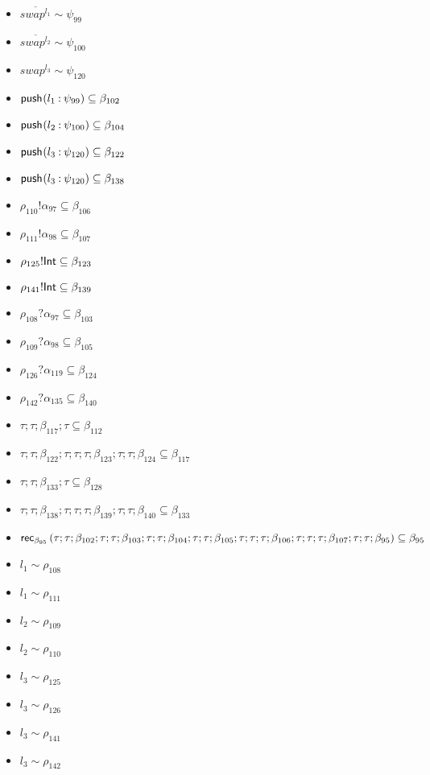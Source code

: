 \documentclass{article}
\begin{document}
\begin{itemize}
\item $ \overline{{swap}^{l_{1}}} \sim\psi_{99} $
\item $ \overline{{swap}^{l_{2}}} \sim\psi_{100} $
\item $ {swap}^{l_{3}} \sim\psi_{120} $
\item $ \pusho{ l_{1}} {\psi_{99}}{} \subseteq \beta_{102} $
\item $ \pusho{ l_{2}} {\psi_{100}}{} \subseteq \beta_{104} $
\item $ \pusho{ l_{3}} {\psi_{120}}{} \subseteq \beta_{122} $
\item $ \pusho{ l_{3}} {\psi_{120}}{} \subseteq \beta_{138} $
\item $ \rho_{110}!\alpha_{97} \subseteq \beta_{106} $
\item $ \rho_{111}!\alpha_{98} \subseteq \beta_{107} $
\item $ \rho_{125}!\tint \subseteq \beta_{123} $
\item $ \rho_{141}!\tint \subseteq \beta_{139} $
\item $ \rho_{108}?\alpha_{97} \subseteq \beta_{103} $
\item $ \rho_{109}?\alpha_{98} \subseteq \beta_{105} $
\item $ \rho_{126}?\alpha_{119} \subseteq \beta_{124} $
\item $ \rho_{142}?\alpha_{135} \subseteq \beta_{140} $
\item $ \tau; \tau; \beta_{117}; \tau \subseteq \beta_{112} $
\item $ \tau; \tau; \beta_{122}; \tau; \tau; \tau; \beta_{123}; \tau; \tau; \beta_{124} \subseteq \beta_{117} $
\item $ \tau; \tau; \beta_{133}; \tau \subseteq \beta_{128} $
\item $ \tau; \tau; \beta_{138}; \tau; \tau; \tau; \beta_{139}; \tau; \tau; \beta_{140} \subseteq \beta_{133} $
\item $ \orec{ (\tau; \tau; \beta_{102}; \tau; \tau; \beta_{103}; \tau; \tau; \beta_{104}; \tau; \tau; \beta_{105}; \tau; \tau; \tau; \beta_{106}; \tau; \tau; \tau; \beta_{107}; \tau; \tau; \beta_{95})}{\beta_{95}} \subseteq \beta_{95} $
\item $ l_{1} \sim\rho_{108} $
\item $ l_{1} \sim\rho_{111} $
\item $ l_{2} \sim\rho_{109} $
\item $ l_{2} \sim\rho_{110} $
\item $ l_{3} \sim\rho_{125} $
\item $ l_{3} \sim\rho_{126} $
\item $ l_{3} \sim\rho_{141} $
\item $ l_{3} \sim\rho_{142} $
\end{itemize}
\end{document}
